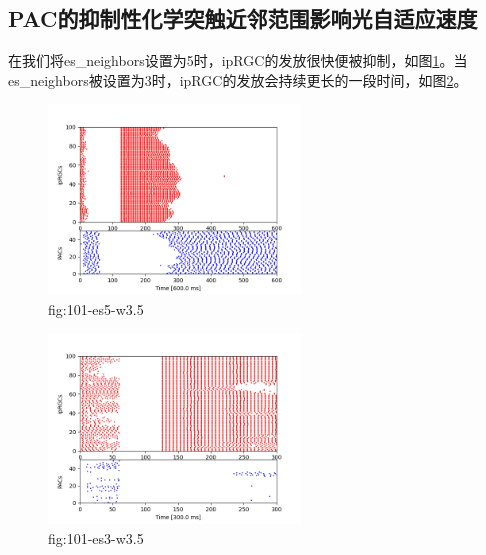\documentclass[lang=cn,11pt,a4paper,cite=numbers]{elegantpaper}
\begin{document}
\subsection{PAC的抑制性化学突触近邻范围影响光自适应速度}
  在我们将es\_neighbors设置为5时，ipRGC的发放很快便被抑制，如图\ref{fig:101-es5-w3.5}。当es\_neighbors被设置为3时，ipRGC的发放会持续更长的一段时间，如图\ref{fig:101-es3-w3.5}。
\begin{figure}[!htb]
  \centering
  \includegraphics[width=0.6\textwidth]{figs/101-es5-w3.5.png}
  \caption{fig:101-es5-w3.5}
  \label{fig:101-es5-w3.5}
\end{figure}\begin{figure}[!htb]
  \centering
  \includegraphics[width=0.6\textwidth]{figs/101-es3-w3.5.png}
  \caption{fig:101-es3-w3.5}
  \label{fig:101-es3-w3.5}
\end{figure}


\end{document}
